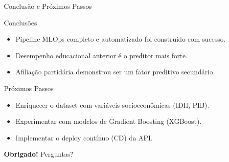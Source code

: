\documentclass{beamer}
\begin{document}
\begin{frame}{Conclusão e Próximos Passos}
    \begin{block}{Conclusões}
        \begin{itemize}
            \item Pipeline MLOps completo e automatizado foi construído com sucesso.
            \item Desempenho educacional anterior é o preditor mais forte.
            \item Afiliação partidária demonstrou ser um fator preditivo secundário.
        \end{itemize}
    \end{block}
    \vfill
    \begin{block}{Próximos Passos}
        \begin{itemize}
            \item Enriquecer o dataset com variáveis socioeconômicas (IDH, PIB).
            \item Experimentar com modelos de Gradient Boosting (XGBoost).
            \item Implementar o deploy contínuo (CD) da API.
        \end{itemize}
    \end{block}
\end{frame}

\begin{frame}
    \begin{center}
        \Huge{\textbf{Obrigado!}}
        \vfill
        \Large{Perguntas?}
    \end{center}
\end{frame}
\end{document}
